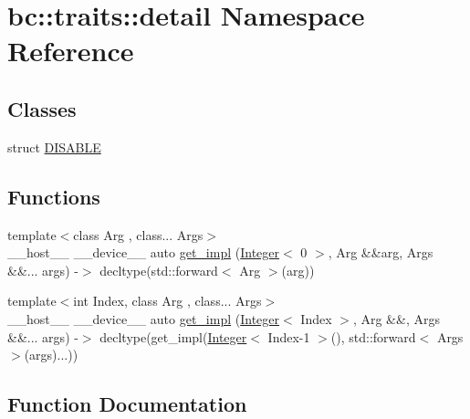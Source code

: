 \hypertarget{namespacebc_1_1traits_1_1detail}{}\section{bc\+:\+:traits\+:\+:detail Namespace Reference}
\label{namespacebc_1_1traits_1_1detail}
\subsection*{Classes}
\begin{DoxyCompactItemize}
\item 
struct \hyperlink{structbc_1_1traits_1_1detail_1_1DISABLE}{D\+I\+S\+A\+B\+LE}
\end{DoxyCompactItemize}
\subsection*{Functions}
\begin{DoxyCompactItemize}
\item 
{\footnotesize template$<$class Arg , class... Args$>$ }\\\+\_\+\+\_\+host\+\_\+\+\_\+ \+\_\+\+\_\+device\+\_\+\+\_\+ auto \hyperlink{namespacebc_1_1traits_1_1detail_a7f1703c90df0f8695969542729765428}{get\+\_\+impl} (\hyperlink{structbc_1_1traits_1_1Integer}{Integer}$<$ 0 $>$, Arg \&\&arg, Args \&\&... args) -\/$>$ decltype(std\+::forward$<$ Arg $>$(arg))
\item 
{\footnotesize template$<$int Index, class Arg , class... Args$>$ }\\\+\_\+\+\_\+host\+\_\+\+\_\+ \+\_\+\+\_\+device\+\_\+\+\_\+ auto \hyperlink{namespacebc_1_1traits_1_1detail_a637e145f0095c679f44a1efcba22aa22}{get\+\_\+impl} (\hyperlink{structbc_1_1traits_1_1Integer}{Integer}$<$ Index $>$, Arg \&\&, Args \&\&... args) -\/$>$ decltype(get\+\_\+impl(\hyperlink{structbc_1_1traits_1_1Integer}{Integer}$<$ Index-\/1 $>$(), std\+::forward$<$ Args $>$(args)...))
\end{DoxyCompactItemize}


\subsection{Function Documentation}
\mbox{\label{namespacebc_1_1traits_1_1detail_a7f1703c90df0f8695969542729765428}} 

